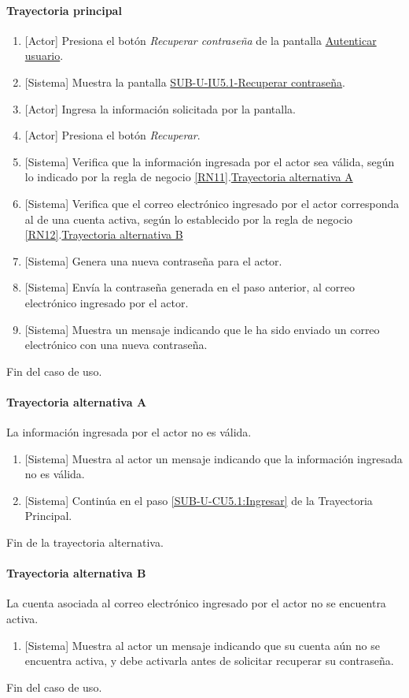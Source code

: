 \paragraph{Trayectoria principal}
	\begin{enumerate}
		\item {[Actor]} Presiona el botón \textit{Recuperar contraseña} de la pantalla \hyperref[fig:sub-u-iu5]{Autenticar usuario}.
		\item {[Sistema]} Muestra la pantalla \hyperref[fig:sub-u-iu5.1]{SUB-U-IU5.1-Recuperar contraseña}.
		\item \label{SUB-U-CU5.1:Ingresar} {[Actor]} Ingresa la información solicitada por la pantalla.
		\item {[Actor]} Presiona el botón \textit{Recuperar}.
		\item {[Sistema]} Verifica que la información ingresada por el actor sea válida, según lo indicado por la regla de negocio \ref{RN11}.\hyperref[SUB-U-CU5.1:TA]{Trayectoria alternativa A}
		\item {[Sistema]} Verifica que el correo electrónico ingresado por el actor corresponda al de una cuenta activa, según lo establecido por la regla de negocio \ref{RN12}.\hyperref[SUB-U-CU5.1:TB]{Trayectoria alternativa B}
		\item {[Sistema]} Genera una nueva contraseña para el actor.
		\item {[Sistema]} Envía la contraseña generada en el paso anterior, al correo electrónico ingresado por el actor.
		\item {[Sistema]} Muestra un mensaje indicando que le ha sido enviado un correo electrónico con una nueva contraseña.
	\end{enumerate}
	Fin del caso de uso.

\paragraph{Trayectoria alternativa A} \label{SUB-U-CU5.1:TA}
	La información ingresada por el actor no es válida.
	\begin{enumerate}[label=A\arabic*.]
		\item {[Sistema]} Muestra al actor un mensaje indicando que la información ingresada no es válida.
		\item {[Sistema]} Continúa en el paso \ref{SUB-U-CU5.1:Ingresar} de la Trayectoria Principal.
	\end{enumerate}
	Fin de la trayectoria alternativa.

\paragraph{Trayectoria alternativa B} \label{SUB-U-CU5.1:TB}
	La cuenta asociada al correo electrónico ingresado por el actor no se encuentra activa.
	\begin{enumerate}[label=A\arabic*.]
		\item {[Sistema]} Muestra al actor un mensaje indicando que su cuenta aún no se encuentra activa, y debe activarla antes de solicitar recuperar su contraseña.
	\end{enumerate}
	Fin del caso de uso.

